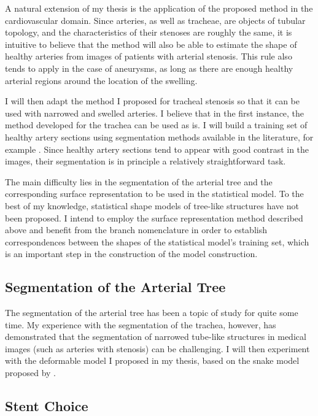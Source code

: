 \documentclass[a4paper]{article}
\begin{document}
A natural extension of my thesis is the application of the proposed method in the cardiovascular domain. Since arteries, as well as tracheae, are objects of tubular topology, and the characteristics of their stenoses are roughly the same, it is intuitive to believe that the method will also be able to estimate the shape of healthy arteries from images of patients with arterial stenosis. This rule also tends to apply in the case of aneurysms, as long as there are enough healthy arterial regions around the location of the swelling.

I will then adapt the method I proposed for tracheal stenosis so that it can be used with narrowed and swelled arteries. I believe that in the first instance, the method developed for the trachea can be used as is. I will build a training set of healthy artery sections using segmentation methods available in the literature, for example \citep{Florez2}. Since healthy artery sections tend to appear with good contrast in the images, their segmentation is in principle a relatively straightforward task. 

The main difficulty lies in the segmentation of the arterial tree and the corresponding surface representation to be used in the statistical model. To the best of my knowledge, statistical shape models of tree-like structures have not been proposed. I intend to employ the surface representation method described above and benefit from the branch nomenclature in order to establish correspondences between the shapes of the statistical model's training set, which is an important step in the construction of the model construction. 

\subsection{Segmentation of the Arterial Tree}

The segmentation of the arterial tree has been a topic of study for quite some time. My experience with the segmentation of the trachea, however, has demonstrated that the segmentation of narrowed tube-like structures in medical images (such as arteries with stenosis) can be challenging. I will then experiment with the deformable model I proposed in my thesis, based on the snake model proposed by \cite{Kass}.

\subsection{Stent Choice}
\end{document}
